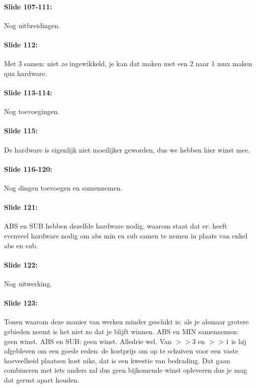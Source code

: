 \documentclass[10pt,a4paper]{book}
\begin{document}
\paragraph{Slide 107-111:} Nog uitbreidingen.

\paragraph{Slide 112:} Met 3 samen: niet \emph{zo} ingewikkeld, je kan dat maken met een 2 naar 1 mux maken qua hardware.

\paragraph{Slide 113-114:} Nog toevoegingen.

\paragraph{Slide 115:} De hardware is eigenlijk niet moeilijker geworden, dus we hebben hier winst mee.

\paragraph{Slide 116-120:} Nog dingen toevoegen en samennemen.

\paragraph{Slide 121:} ABS en SUB hebben dezelfde hardware nodig, waarom staat dat er: heeft evenveel hardware nodig om abs min en sub samen te nemen in plaats van enkel abs en sub.

\paragraph{Slide 122:} Nog uitwerking.

\paragraph{Slide 123:} Tonen waarom deze manier van werken minder geschikt is: als je alsmaar grotere gebieden neemt is het niet zo dat je blijft winnen. ABS en MIN samennemen: geen winst. ABS en SUB: geen winst. Alledrie wel. Van $>>3$ en $>>1$ is hij afgebleven om een goede reden: de kostprijs om op te schuiven voor een vaste hoeveelheid plaatsen kost niks, dat is een kwestie van bedrading. Dat gaan combineren met iets anders zal dus geen bijkomende winst opleveren dus je mag dat gerust apart houden.
\end{document}
